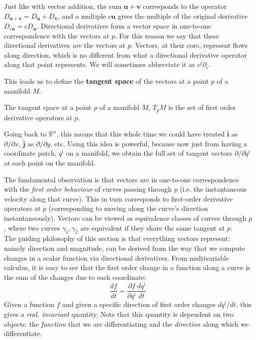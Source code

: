 	Just like with vector addition, the sum $\mathbf u + \mathbf v$ corresponds to the operator $ D_{\mathbf u + \mathbf v} = D_\mathbf u + D_\mathbf v$, and a multiple $c \mathbf u$ gives the multiple of the original derivative $D_{c \mathbf u} = c D_\mathbf u$. Directional derivatives form a vector space in one-to-one correspondence with the vectors at $p$.  For this reason we say that these directional derivatives \emph{are} the vectors at $p$. Vectors, at their core, represent flows along direction, which is no different from what a directional derivative operator along that point represents. We will sometimes abbreviate it as $v^i \partial_i$.
	
	This leads us to define the \textbf{tangent space} of the vectors at a point $p$ of a manifold $M$.
	\begin{defn}
		The tangent space at a point $p$ of a manifold $M$, $T_p M$ is the set of first order derivative operators at $p$.
	\end{defn}

	Going back to $\mathbb{R}^n$, this means that this whole time we could have treated $\hat{\mathbf{i}}$ as $\partial/\partial x$, $\hat{\mathbf{j}}$ as $\partial/\partial y$, etc. Using this idea is powerful, because now just from having a coordinate patch, $q^i$ on a manifold, we obtain the full set of tangent vectors $\partial/\partial q^i$ at each point on the manifold. 
	
	The fundamental observation is that vectors are in one-to-one correspondence with the \emph{first order behaviour} of curves passing through $p$ (i.e. the instantaneous velocity along that curve). This in turn corresponds to first-order derivative operators at $p$ (corresponding to moving along the curve's direction instantaneously). Vectors can be viewed as equivalence classes of curves through $p$, where two curves $\gamma_1, \gamma_2$ are equivalent if they share the same tangent at $p$. \\
	
	The guiding philosophy of this section is that everything vectors represent: namely direction and magnitude, can be derived from the way that we compute changes in a scalar function via directional derivatives. From multivariable calculus, it is easy to see that the first order change in a function along a curve is the sum of the changes due to each coordinate:
	\begin{equation}
		\frac{df}{dt} = \frac{\partial f}{\partial q^i} \frac{dq^i}{dt}
	\end{equation}
	Given a function $f$ and given a specific direction of first order changes $dq^i/dt$, this gives a \emph{real, invariant} quantity. Note that this quantity is dependent on two objects: the \emph{function} that we are differentiating and the \emph{direction} along which we differentiate.
	
